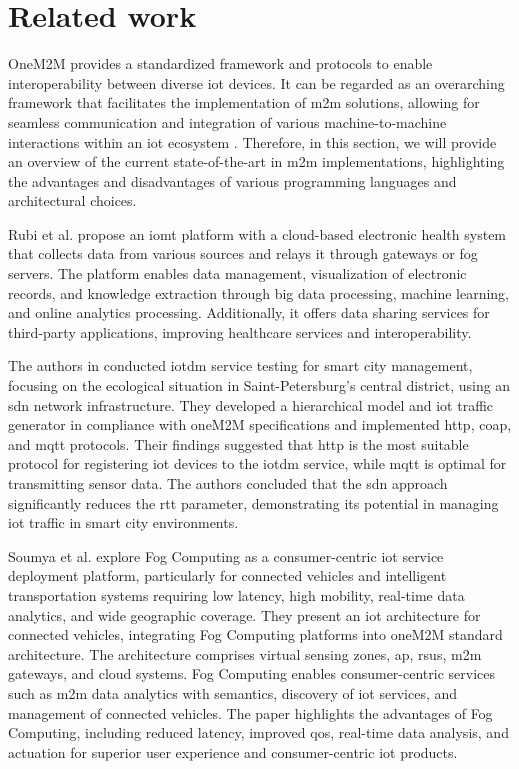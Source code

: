 \documentclass[a4paper,fleqn]{cas-dc}
\begin{document}
\section{Related work}
\label{relatedWork}

OneM2M provides a standardized framework and protocols to enable interoperability between diverse \gls{iot} devices. It can be regarded as an overarching framework that facilitates the implementation of \gls{m2m} solutions, allowing for seamless communication and integration of various machine-to-machine interactions within an \gls{iot} ecosystem \cite{onem2m_standard}. Therefore, in this section, we will provide an overview of the current state-of-the-art in \gls{m2m} implementations, highlighting the advantages and disadvantages of various programming languages and architectural choices.

Rubi et al. \cite{Rubi2019} propose an \gls{iomt} platform with a cloud-based electronic health system that collects data from various sources and relays it through gateways or fog servers. The platform enables data management, visualization of electronic records, and knowledge extraction through big data processing, machine learning, and online analytics processing. Additionally, it offers data sharing services for third-party applications, improving healthcare services and interoperability.

The authors in \cite{Volkov2017} conducted \gls{iotdm} service testing for smart city management, focusing on the ecological situation in Saint-Peters\-burg's central district, using an \gls{sdn} network infrastructure. They developed a hierarchical model and \gls{iot} traffic generator in compliance with oneM2M specifications and implemented \gls{http}, \gls{coap}, and \gls{mqtt} protocols. Their findings suggested that \gls{http} is the most suitable protocol for registering \gls{iot} devices to the \gls{iotdm} service, while \gls{mqtt} is optimal for transmitting sensor data. The authors concluded that the \gls{sdn} approach significantly reduces the \gls{rtt} parameter, demonstrating its potential in managing \gls{iot} traffic in smart city environments.

Soumya et al. \cite{Datta2015} explore Fog Computing as a consumer-centric \gls{iot} service deployment platform, particularly for connected vehicles and intelligent transportation systems requiring low latency, high mobility, real-time data analytics, and wide geographic coverage. They present an \gls{iot} architecture for connected vehicles, integrating Fog Computing platforms into oneM2M standard architecture. The architecture comprises virtual sensing zones, \gls{ap}, \gls{rsus}, \gls{m2m} gateways, and cloud systems. Fog Computing enables consumer-centric services such as \gls{m2m} data analytics with semantics, discovery of \gls{iot} services, and management of connected vehicles. The paper highlights the advantages of Fog Computing, including reduced latency, improved \gls{qos}, real-time data analysis, and actuation for superior user experience and consumer-centric \gls{iot} products.
\end{document}

